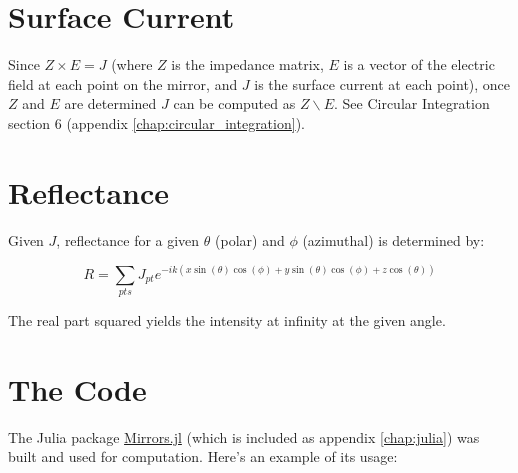 \documentclass[etd,twoside,senior,noacknowledgments]{BYUPhys}
\begin{document}

\section{Surface Current} \label{sec:current}

Since $Z \times E = J$ (where $Z$ is the impedance matrix, $E$ is a vector of the electric field at each point on the mirror, and $J$ is the surface current at each point), once $Z$ and $E$ are determined $J$ can be computed as $Z \backslash E$. See Circular Integration section 6 (appendix \ref{chap:circular_integration}).



\section{Reflectance} \label{sec:reflectance}

Given $J$, reflectance for a given $\theta$ (polar) and $\phi$ (azimuthal) is determined by:

\begin{equation}
  R=\sum_{pts}J_{pt}e^{-ik\left(x\sin\left(\theta\right)\cos\left(\phi\right)+y\sin\left(\theta\right)\cos\left(\phi\right)+z\cos\left(\theta\right)\right)}
\end{equation}

The real part squared yields the intensity at infinity at the given angle.







\section{The Code}\label{sec:code}

The Julia package \href{https://github.com/mjg0/Mirrors.jl}{Mirrors.jl} (which is included as appendix \ref{chap:julia}) was built and used for computation. Here's an example of its usage:
\end{document}
